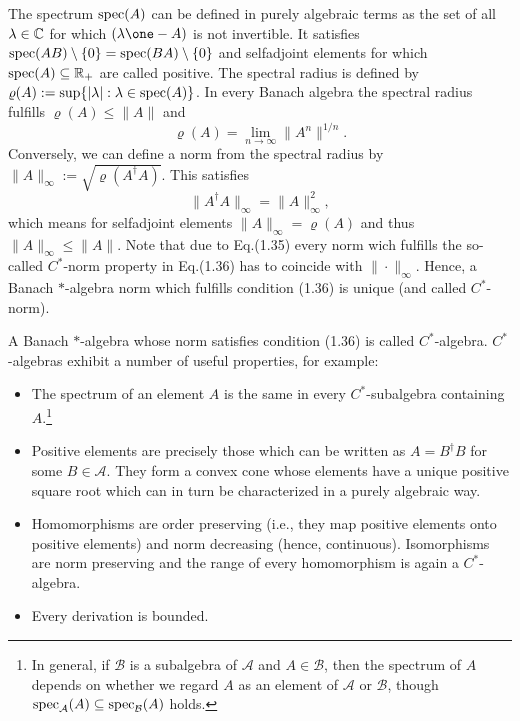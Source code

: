 \documentclass[11pt,a4paper]{article}
\theoremstyle{plain}
\theoremstyle{definition}
\theoremstyle{remark}
\numberwithin{equation}{section}
\begin{document}
The spectrum $\operatorname{spec}(A)$ can be defined in purely algebraic terms as the set of all $\lambda\in \mathbb{C}$ for which $(\lambda\one-A)$ is not invertible. It satisfies $\operatorname{spec}(AB)\setminus\{0\}=\operatorname{spec}(BA)\setminus\{0\}$ and selfadjoint elements for which $\operatorname{spec}(A)\subseteq \mathbb{R}_+$ are called positive. The spectral radius is defined by $\varrho(A):=\sup\{|\lambda|:\lambda\in \operatorname{spec}(A)\}$. In every Banach algebra the spectral radius fulfills $\varrho(A)\le \|A\|$ and
\begin{equation}
    \varrho(A)=\lim_{n\to\infty} \|A^n\|^{1/n}.
\end{equation}
Conversely, we can define a norm from the spectral radius by $\|A\|_\infty:=\sqrt{\varrho(A^\dagger A)}$. This satisfies
\begin{equation}
    \|A^\dagger A\|_\infty = \|A\|_\infty^2,
\end{equation}
which means for selfadjoint elements $\|A\|_\infty=\varrho(A)$ and thus $\|A\|_\infty\le \|A\|$. Note that due to Eq.(1.35) every norm wich fulfills the so-called $C^\ast$-norm property in Eq.(1.36) has to coincide with $\|\cdot\|_\infty$. Hence, a Banach $\ast$-algebra norm which fulfills condition (1.36) is unique (and called $C^\ast$-norm).

A Banach $\ast$-algebra whose norm satisfies condition (1.36) is called $C^\ast$-algebra. $C^\ast$-algebras exhibit a number of useful properties, for example:
\begin{itemize}
    \item The spectrum of an element $A$ is the same in every $C^\ast$-subalgebra containing $A$.\footnote{In general, if $\mathcal{B}$ is a subalgebra of $\mathcal{A}$ and $A\in \mathcal{B}$, then the spectrum of $A$ depends on whether we regard $A$ as an element of $\mathcal{A}$ or $\mathcal{B}$, though $\operatorname{spec}_{\mathcal{A}}(A)\subseteq \operatorname{spec}_{\mathcal{B}}(A)$ holds.}
    \item Positive elements are precisely those which can be written as $A=B^\dagger B$ for some $B\in \mathcal{A}$. They form a convex cone whose elements have a unique positive square root which can in turn be characterized in a purely algebraic way.
    \item Homomorphisms are order preserving (i.e., they map positive elements onto positive elements) and norm decreasing (hence, continuous). Isomorphisms are norm preserving and the range of every homomorphism is again a $C^\ast$-algebra.
    \item Every derivation is bounded.
\end{itemize}
\end{document}
